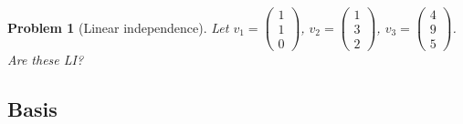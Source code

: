 \documentclass{article}
\newtheorem{problem}{Problem}
\begin{document}
\begin{problem}[Linear independence]
    Let $v_1=\begin{pmatrix}1\\1\\0\end{pmatrix}$, $v_2=\begin{pmatrix}1\\3\\2\end{pmatrix}$, $v_3=\begin{pmatrix}4\\9\\5\end{pmatrix}$. Are these LI?
\end{problem}

\subsection{Basis}
\end{document}
